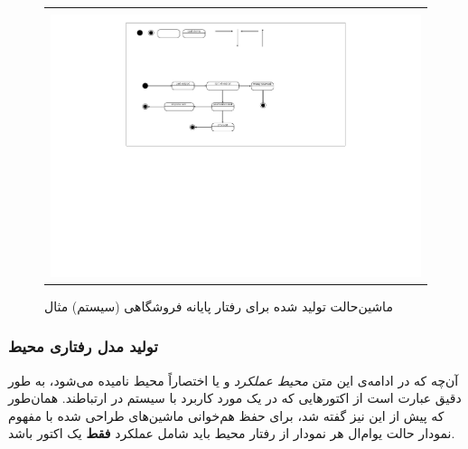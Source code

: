\begin{figure}
    \begin{center}
    \begin{tabular}{| c |}
   	\hline
	\\
  	 \includegraphics[width=12cm]{4-ProposedFramework/Figures/purchasePOS.pdf}
	\\
	\hline
  \end{tabular}
  \end{center}
   \caption{\label{fig:purchasePOS} ماشین‌حالت تولید شده برای رفتار پایانه فروشگاهی (سیستم) مثال}
\end{figure}

\subsubsection{تولید مدل رفتاری محیط}
آن‌چه که در ادامه‌ی این متن \emph{محیط عملکرد} و یا اختصاراً محیط نامیده می‌شود، به طور دقیق عبارت است از اکتورهایی که در یک مورد کاربرد با سیستم در ارتباطند. همان‌طور که پیش از این نیز گفته شد، برای حفظ هم‌خوانی ماشین‌های طراحی شده با مفهوم نمودار حالت یو‌ام‌ال هر نمودار از رفتار محیط باید شامل عملکرد \textbf{فقط} یک اکتور باشد. 

